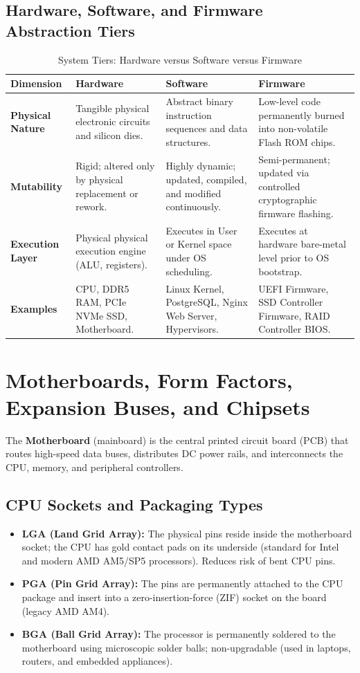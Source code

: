 \subsection{Hardware, Software, and Firmware Abstraction Tiers}
\begin{table}[htbp]
\centering
\small
\caption{System Tiers: Hardware versus Software versus Firmware}
\label{tab:hw_sw_fw}
\begin{tabularx}{\textwidth}{l X X X}
\toprule
\textbf{Dimension} & \textbf{Hardware} & \textbf{Software} & \textbf{Firmware} \\
\midrule
\textbf{Physical Nature} & Tangible physical electronic circuits and silicon dies. & Abstract binary instruction sequences and data structures. & Low-level code permanently burned into non-volatile Flash ROM chips. \\
\textbf{Mutability} & Rigid; altered only by physical replacement or rework. & Highly dynamic; updated, compiled, and modified continuously. & Semi-permanent; updated via controlled cryptographic firmware flashing. \\
\textbf{Execution Layer} & Physical physical execution engine (ALU, registers). & Executes in User or Kernel space under OS scheduling. & Executes at hardware bare-metal level prior to OS bootstrap. \\
\textbf{Examples} & CPU, DDR5 RAM, PCIe NVMe SSD, Motherboard. & Linux Kernel, PostgreSQL, Nginx Web Server, Hypervisors. & UEFI Firmware, SSD Controller Firmware, RAID Controller BIOS. \\
\bottomrule
\end{tabularx}
\end{table}


\section{Motherboards, Form Factors, Expansion Buses, and Chipsets}
\label{sec:motherboards}

The \textbf{Motherboard} (mainboard) is the central printed circuit board (PCB) that routes high-speed data buses, distributes DC power rails, and interconnects the CPU, memory, and peripheral controllers.

\subsection{CPU Sockets and Packaging Types}
\begin{itemize}
    \item \textbf{LGA (Land Grid Array):} The physical pins reside inside the motherboard socket; the CPU has gold contact pads on its underside (standard for Intel and modern AMD AM5/SP5 processors). Reduces risk of bent CPU pins.
    \item \textbf{PGA (Pin Grid Array):} The pins are permanently attached to the CPU package and insert into a zero-insertion-force (ZIF) socket on the board (legacy AMD AM4).
    \item \textbf{BGA (Ball Grid Array):} The processor is permanently soldered to the motherboard using microscopic solder balls; non-upgradable (used in laptops, routers, and embedded appliances).
\end{itemize}

